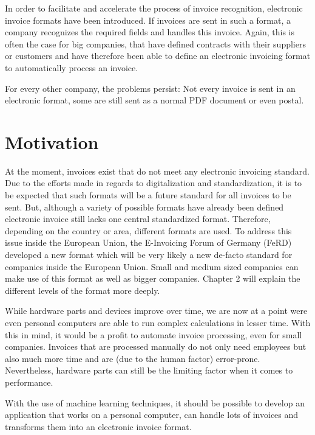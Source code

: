 In order to facilitate and accelerate the process of invoice recognition, electronic invoice formats have been introduced. If invoices are sent in such a format, a company recognizes the required fields and handles this invoice. Again, this is often the case for big companies, that have defined contracts with their suppliers or customers and have therefore been able to define an electronic invoicing format to automatically process an invoice.

For every other company, the problems persist: Not every invoice is sent in an electronic format, some are still sent as a normal PDF document or even postal.

\section{Motivation}
\label{sec1.2}

At the moment, invoices exist that do not meet any electronic invoicing standard. Due to the efforts made in regards to digitalization and standardization, it is to be expected that such formats will be a future standard for all invoices to be sent. But, although a variety of possible formats have already been defined electronic invoice still lacks one central standardized format.
Therefore, depending on the country or area, different formats are used. To address this issue inside the European Union, the E-Invoicing Forum of Germany (FeRD) developed a new format which will be very likely a new de-facto standard for companies inside the European Union. Small and medium sized companies can make use of this format as well as bigger companies. Chapter 2 will explain the different levels of the format more deeply.

While hardware parts and devices improve over time, we are now at a point were even personal computers are able to run complex calculations in lesser time. With this in mind, it would be a profit to automate invoice processing, even for small companies. Invoices that are processed manually do not only need employees but also much more time and are (due to the human factor) error-prone. Nevertheless, hardware parts can still be the limiting factor when it comes to performance.

With the use of machine learning techniques, it should be possible to develop an application that works on a personal computer, can handle lots of invoices and transforms them into an electronic invoice format.

